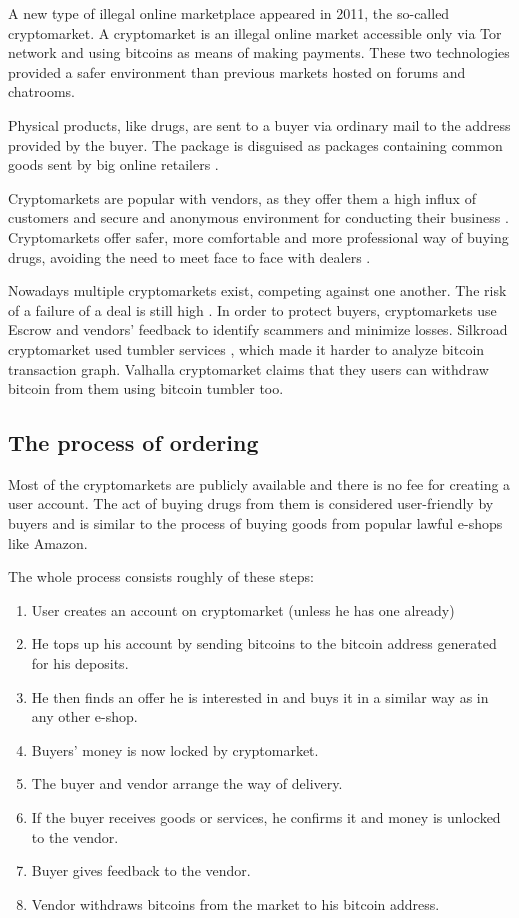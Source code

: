 \documentclass[
  digital, %
  table,   %
  lof,     %
  lot,     %
  oneside
]{fithesis3}
\begin{document}
A new type of illegal online marketplace appeared in 2011, the so-called cryptomarket. 
A cryptomarket is an illegal online market accessible only via Tor network and using bitcoins
as means of making payments. These two technologies provided a safer environment
than previous markets hosted on forums and chatrooms.

Physical products, like drugs, are sent to a buyer via ordinary mail to the address provided by the buyer.
The package is disguised as packages containing common goods sent by big online retailers
\cite{paquet2017cryptomarkets}.

Cryptomarkets are popular with vendors,
as they offer them a high influx of customers and secure and anonymous environment for conducting their business \cite{van2014responsible}.
Cryptomarkets offer safer, more comfortable and more professional way of buying drugs, avoiding 
the need to meet face to face with dealers \cite{barratt2014use}.

Nowadays multiple cryptomarkets exist, competing against one another. The risk
of a failure of a deal is still high \cite{wehinger2011dark}.
In order to protect buyers, cryptomarkets use Escrow and vendors' feedback to identify scammers and minimize losses.
Silkroad cryptomarket used tumbler services \cite{ron2014did},
which made it harder to analyze bitcoin transaction graph. Valhalla cryptomarket claims that they
users can withdraw bitcoin from them using bitcoin tumbler too.

\subsection{The process of ordering}
Most of the cryptomarkets are publicly available and there is no fee
for creating a user account. The act of buying drugs from them is considered user-friendly by buyers and is similar
to the process of buying goods from popular lawful e-shops like Amazon.

 The whole process consists roughly of these steps:
\begin{enumerate}
\item User creates an account on cryptomarket (unless he has one already)
\item He tops up his account by sending bitcoins to the bitcoin address generated for his deposits.
\item He then finds an offer he is interested in and buys it in a similar way as in any other e-shop.
\item Buyers' money is now locked by cryptomarket.
\item The buyer and vendor arrange the way of delivery.
\item If the buyer receives goods or services, he confirms it and money is unlocked to the vendor.
\item Buyer gives feedback to the vendor. 
\item Vendor withdraws bitcoins from the market to his bitcoin address.
\end{enumerate}
\end{document}
